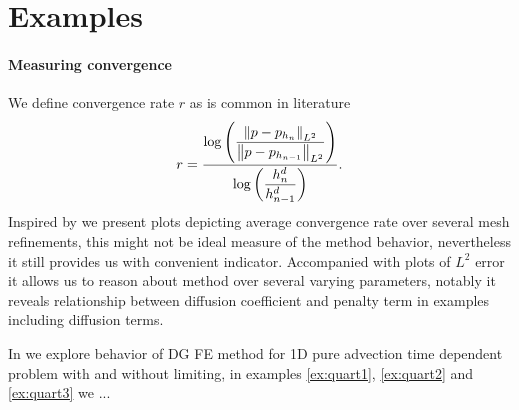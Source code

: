 \section{Examples}

\paragraph{Measuring convergence} We define convergence rate $r$ as is common 
in literature
\begin{equation}
r = \frac{\log\left(\dfrac{\left\lVert p - p_{h_{n}}\right\rVert_{L^2}}{\left\lVert p - p_{h_{n-1}}\right\rVert_{L^2}}\right)}
{\log\left(\dfrac{h^d_{n}}{h^d_{n-1}}\right)}.
\end{equation}
Inspired by \cite{Kucera} we present plots depicting average convergence rate over 
several mesh refinements, this might not be ideal measure of the method behavior, 
nevertheless it still provides us with convenient indicator. Accompanied with plots of 
$L^2$ error it allows us to reason about method over several varying parameters, notably 
it reveals relationship between diffusion coefficient and penalty term in examples 
including 
diffusion terms.

In  we explore behavior of DG FE method for 1D pure advection 
time dependent problem with and without limiting, in examples \ref{ex:quart1}, 
\ref{ex:quart2} and \ref{ex:quart3} we \todo ...


